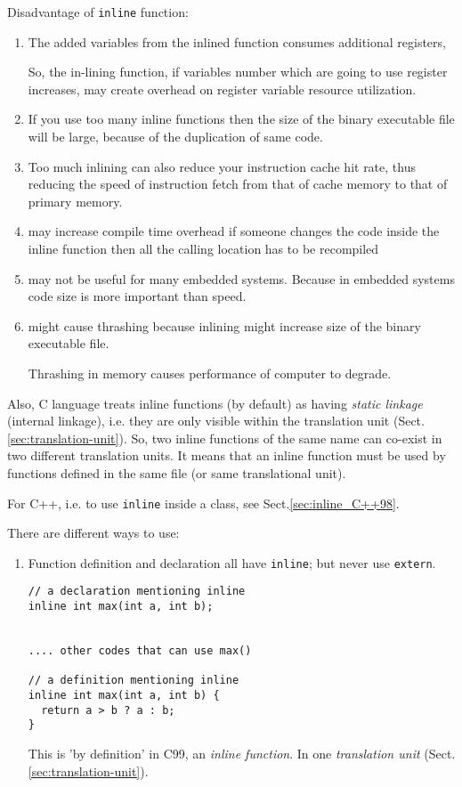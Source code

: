 \begin{mdframed}

Disadvantage of \verb!inline! function:
\begin{enumerate}
  \item The added variables from the inlined function consumes additional registers,
  
  So, the in-lining function, if variables number which are going to use register
  increases, may create overhead on register variable resource
  utilization.
  
  \item If you use too many inline functions then the size of the binary executable file will be large, because of the duplication of same code.
  
  \item Too much inlining can also reduce your instruction cache hit rate, thus
  reducing the speed of instruction fetch from that of cache memory to that of
  primary memory.

  \item may increase compile time overhead if someone changes the code inside the inline function then all the calling location has to be recompiled
  
  \item may not be useful for many embedded systems. Because in embedded systems code size is more important than speed.
  
  \item might cause thrashing because inlining might increase size of the binary executable file.
  
  Thrashing in memory causes performance of computer to degrade.
  
\end{enumerate}
\end{mdframed}


Also, C language treats inline functions (by default) as having {\it static
linkage} (internal linkage), i.e. they are only visible within the translation
unit (Sect.\ref{sec:translation-unit}). So, two inline functions of the same
name can co-exist in two different translation units.
It means that an inline function must be used by functions defined in the same
file (or same translational unit).


For C++, i.e. to use \verb!inline! inside a class, see
Sect.\ref{sec:inline_C++98}.


There are different ways to use:
\begin{enumerate}
  \item Function definition and declaration all have \verb!inline!; but never
  use \verb!extern!.
\begin{lstlisting}
// a declaration mentioning inline
inline int max(int a, int b);


.... other codes that can use max()

// a definition mentioning inline
inline int max(int a, int b) {
  return a > b ? a : b;
}
\end{lstlisting}
  This is 'by definition' in C99, an {\it inline function}. In one {\it
  translation unit} (Sect.\ref{sec:translation-unit}). 
  
   
\end{enumerate}

